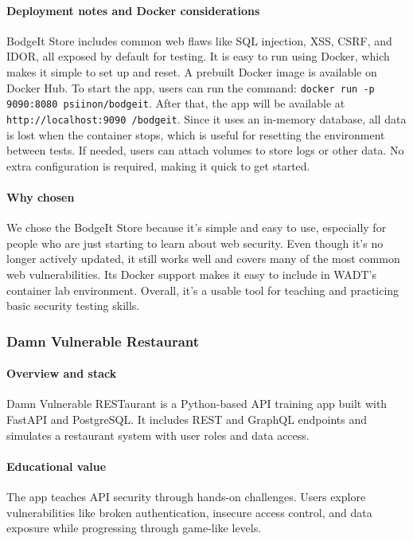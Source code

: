 \documentclass[12pt]{article}
\begin{document}
\paragraph{Deployment notes and Docker considerations}
BodgeIt Store includes common web flaws like SQL injection, XSS, CSRF, and IDOR, all exposed by default for testing. It is easy to run using Docker, which makes it simple to set up and reset. A prebuilt Docker image is available on Docker Hub. To start the app, users can run the command: \texttt{docker run -p 9090:8080 psiinon/bodgeit}. After that, the app will be available at \texttt{http://localhost:9090
/bodgeit}. Since it uses an in-memory database, all data is lost when the container stops, which is useful for resetting the environment between tests. If needed, users can attach volumes to store logs or other data. No extra configuration is required, making it quick to get started.

\paragraph{Why chosen}
We chose the BodgeIt Store because it’s simple and easy to use, especially for people who are just starting to learn about web security. Even though it’s no longer actively updated, it still works well and covers many of the most common web vulnerabilities. Its Docker support makes it easy to include in WADT’s container lab environment. Overall, it’s a usable tool for teaching and practicing basic security testing skills.

\subsubsection{Damn Vulnerable Restaurant}

\paragraph{Overview and stack}
Damn Vulnerable RESTaurant is a Python-based API training app built with FastAPI and PostgreSQL. It includes REST and GraphQL endpoints and simulates a restaurant system with user roles and data access.

\paragraph{Educational value}
The app teaches API security through hands-on challenges. Users explore vulnerabilities like broken authentication, insecure access control, and data exposure while progressing through game-like levels.
\end{document}
